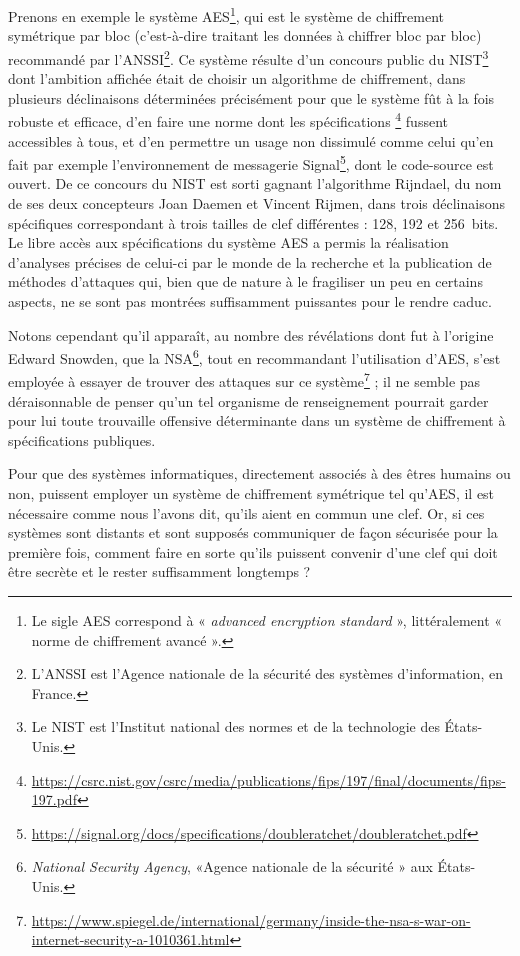 Prenons en exemple le système AES\footnote{Le sigle AES correspond à « \emph{advanced encryption
standard} », littéralement « norme de chiffrement avancé ».}, qui est le système de chiffrement
symétrique par bloc (c’est-à-dire traitant les données à chiffrer bloc par bloc) recommandé par
l’ANSSI\footnote{L’ANSSI est l’Agence nationale de la sécurité des systèmes d’information, en
France.}.
Ce système résulte d’un concours public du NIST\footnote{Le NIST est l’Institut national des normes
et de la technologie des États-Unis.} dont l’ambition affichée était de choisir un algorithme de
chiffrement, dans plusieurs déclinaisons déterminées précisément pour que le système fût à la fois
robuste et efficace, d’en faire une norme dont les spécifications%
\footnote{\url{https://csrc.nist.gov/csrc/media/publications/fips/197/final/documents/fips-197.pdf}}
fussent accessibles à tous, et d’en permettre un usage non dissimulé comme celui qu’en fait par
exemple l’environnement de messagerie
Signal\footnote{\url{https://signal.org/docs/specifications/doubleratchet/doubleratchet.pdf}}, dont le
code-source est ouvert.
De ce concours du NIST est sorti gagnant l’algorithme Rijndael, du nom de ses deux concepteurs
Joan Daemen et Vincent Rijmen, dans trois déclinaisons spécifiques correspondant à trois tailles de
clef différentes : 128, 192 et 256~bits. 
Le libre accès aux spécifications du système AES a permis la réalisation d’analyses précises de
celui-ci par le monde de la recherche et la publication de méthodes d’attaques qui, bien que de
nature à le fragiliser un peu en certains aspects, ne se sont pas montrées suffisamment
puissantes pour le rendre caduc.

Notons cependant qu’il apparaît, au nombre des révélations dont fut à l’origine Edward Snowden, que
la NSA\footnote{\emph{National Security Agency}, «Agence nationale de la sécurité » aux États-Unis.},
tout en recommandant l’utilisation d’AES, s’est employée à essayer de trouver des attaques sur ce
système\footnote{\url{https://www.spiegel.de/international/germany/inside-the-nsa-s-war-on-internet-security-a-1010361.html}} ; il ne semble pas déraisonnable de penser qu’un tel organisme de renseignement pourrait
garder pour lui toute trouvaille offensive déterminante dans un système de chiffrement à
spécifications publiques.

Pour que des systèmes informatiques, directement associés à des êtres humains ou non, puissent employer
un système de chiffrement symétrique tel qu’AES, il est nécessaire comme nous l’avons dit, qu’ils
aient en commun une clef.
Or, si ces systèmes sont distants et sont supposés communiquer de façon sécurisée pour la première
fois, comment faire en sorte qu’ils puissent convenir d’une clef qui doit être secrète et le rester
suffisamment longtemps ?

